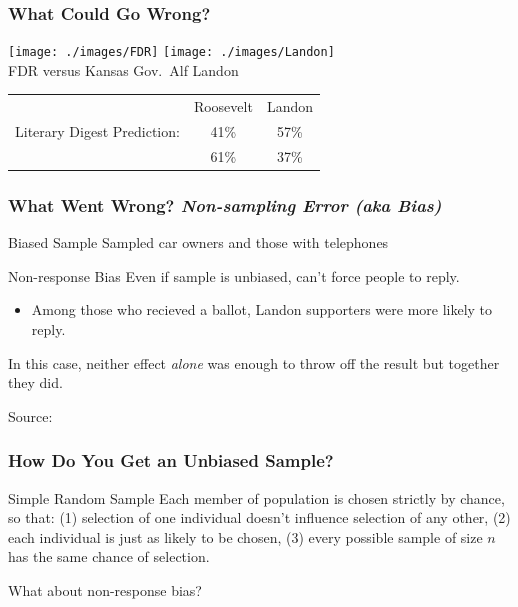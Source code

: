 \documentclass{beamer}
\begin{document}
\begin{frame}
\frametitle{What Could Go Wrong?}
	\begin{center}
		\texttt{[image: ./images/FDR]}
		\texttt{[image: ./images/Landon]}\\
		\small FDR versus Kansas Gov.\ Alf Landon
	\end{center}
	\normalsize
	\begin{center}
		\begin{tabular}{lcc}
									&Roosevelt		&Landon\\
		Literary Digest Prediction: 	&41\% 			& \alert{57\%}\\
		\onslide<3>{	Actual Result: 				&\alert{61\%} 	& 37\%}
		\end{tabular}
	\end{center}
	
\end{frame}

\begin{frame}
\frametitle{What Went Wrong? \emph{Non-sampling Error (aka Bias)}}
	\begin{block}{Biased Sample}
		Sampled car owners and those with telephones
	\end{block}
	
	\begin{block}{Non-response Bias}
	Even if sample is unbiased, can't force people to reply.
		\begin{itemize}
			\item Among those who recieved a ballot, Landon supporters were more likely to reply.
		\end{itemize}
	\end{block}
	\alert{In this case, neither effect \emph{alone} was enough to throw off the result but together 		they did.}
	
	\tiny{Source: \href{http://www.jstor.org/stable/10.2307/2749114}{}}
\end{frame}

\begin{frame}
\frametitle{How Do You Get an Unbiased Sample?}
	\begin{block}{Simple Random Sample}	
		Each member of population is chosen strictly by chance, so that: (1) selection of one 					individual doesn't influence selection of any other, (2) each individual is just as likely to be 			chosen, (3) every possible sample of size $n$ has the same chance of selection.	
	\end{block}
	
	\begin{block}{What about non-response bias?}
	\end{block}
\end{frame}
\end{document}

